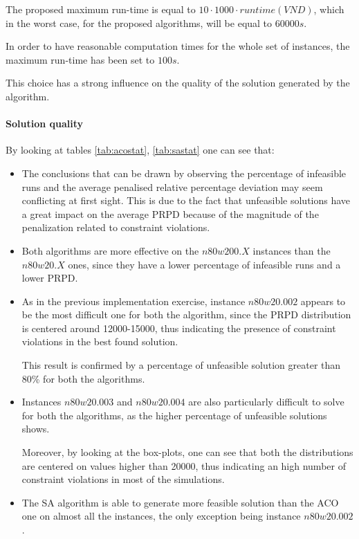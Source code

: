 The proposed maximum run-time is equal to $10 \cdot 1000 \cdot runtime(VND)$, which in the worst case, for the proposed algorithms, will be equal to $60000s$.
  
In order to have reasonable computation times for the whole set of instances, the maximum run-time has been set to $100s$.
  
This choice has a strong influence on the quality of the solution generated by the algorithm.

\paragraph{Solution quality}

By looking at tables \ref{tab:acostat}, \ref{tab:sastat} one can see that:
\begin{itemize}

\item The conclusions that can be drawn by observing the percentage of infeasible runs and the average penalised relative percentage deviation may seem conflicting at first sight. 
This is due to the fact that unfeasible solutions have a great impact on the average PRPD because of the magnitude of the penalization related to constraint violations.

\item Both algorithms are more effective on the $n80w200.X$ instances than the $n80w20.X$ ones, since they have a lower percentage of infeasible runs and a lower PRPD.

\item As in the previous implementation exercise, instance $n80w20.002$ appears to be the most difficult one for both the algorithm, since the PRPD distribution is centered around 12000-15000, thus indicating the presence of constraint violations in the best found solution.

This result is confirmed by a percentage of unfeasible solution greater than 80\% for both the algorithms.

\item Instances $n80w20.003$ and $n80w20.004$ are also particularly difficult to solve for both the algorithms, as the higher percentage of unfeasible solutions shows.

Moreover, by looking at the box-plots, one can see that both the distributions are centered on values higher than 20000, thus indicating an high number of constraint violations in most of the simulations.


\item The SA algorithm is able to generate more feasible solution than the ACO one on almost all the instances, the only exception being instance $n80w20.002$.


\end{itemize}
